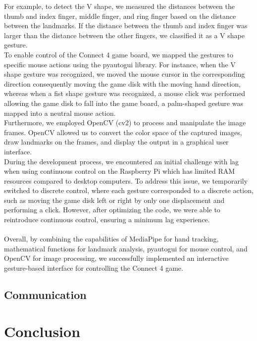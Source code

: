 \documentclass[12pt, a4paper, oneside]{report}
\begin{document}
For example, to detect the V shape, we measured the distances between the thumb and index finger, middle finger, and ring finger based on the distance between the landmarks. If the distance between the thumb and index finger was larger than the distance between the other fingers, we classified it as a V shape gesture.\\

To enable control of the Connect 4 game board, we mapped the gestures to specific mouse actions using the pyautogui library. For instance, when the V shape gesture was recognized, we moved the mouse cursor in the corresponding direction consequently moving the game disk with the moving hand direction, whereas when a fist shape gesture was recognized, a mouse click was performed allowing the game disk to fall into the game board, a palm-shaped gesture was mapped into a neutral mouse action. \\

Furthermore, we employed OpenCV (cv2) to process and manipulate the image frames. OpenCV allowed us to convert the color space of the captured images, draw landmarks on the frames, and display the output in a graphical user interface.\\

During the development process, we encountered an initial challenge with lag when using continuous control on the Raspberry Pi which has limited RAM resources compared to desktop computers. To address this issue, we temporarily switched to discrete control, where each gesture corresponded to a discrete action, such as moving the game disk left or right by only one displacement and performing a click. However, after optimizing the code, we were able to reintroduce continuous control, ensuring a minimum lag experience.\\ \\

Overall, by combining the capabilities of MediaPipe for hand tracking, mathematical functions for landmark analysis, pyautogui for mouse control, and OpenCV for image processing, we successfully implemented an interactive gesture-based interface for controlling the Connect 4 game.\\
	\section{Communication}

	\chapter{Conclusion}
\end{document}

